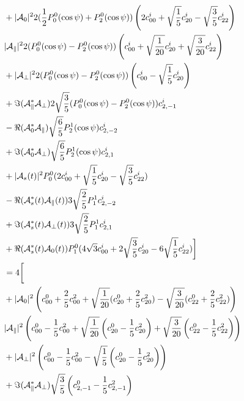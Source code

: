 \begin{align}
          &                  +|{\cal A}_0|^2 2 (\frac{1}{2}P_0^0(\cos\psi)+P_2^0(\cos\psi) ) \left( 2 c^i_{00}+\sqrt{\frac{1}{ 5}}c^i_{20}-\sqrt{\frac{3}{ 5}}c^i_{22} \right) \\
          &                   |{\cal A}_\parallel|^2 2( P_0^0(\cos\psi) - P_2^0(\cos\psi)  )           \left( c^i_{00}  +\sqrt{\frac{1}{20}}c^i_{20}+\sqrt{\frac{3}{20}}c^i_{22}  \right)  \\
          &                  +|{\cal A}_\perp|^2 2 ( P_0^0(\cos\psi) - P_2^0(\cos\psi)  )              \left( c^i_{00}  -\sqrt{\frac{1}{ 5}}c^i_{20}\right)\\
          &                  +\Im({\cal A}_\parallel^*{\cal A}_\perp)2\sqrt{\frac{3}{5}} ( P_0^0(\cos\psi) - P_2^0(\cos\psi)  ) c^i_{2,-1}  \\
          &                  -\Re({\cal A}_0^*{\cal A}_\parallel  )  \sqrt{\frac{6}{5}}P_2^1(\cos\psi) c^i_{2,-2}\\ 
          &                  +\Im({\cal A}_0^* {\cal A}_\perp )      \sqrt{\frac{6}{5}}P_2^1(\cos\psi)c^i_{2,1} \\
          &                  +|{\cal A}_{s}(t)|^2  P_0^0 (2c^i_{00} + \sqrt{\frac{1}{5}}c^i_{20} -\sqrt{\frac{3}{5}} c^i_{22}) \\
          &                  -\Re({\cal A}_{s}^*(t){\cal A}_\parallel(t)) 3\sqrt{\frac{2}{5}} P_1^1 c^i_{2,-2}\\
          &                  +\Im({\cal A}_{s}^*(t){\cal A}_\perp(t)) 3\sqrt{\frac{2}{5}} P_1^1 c^i_{2,1}\\
          &                  +\Re({\cal A}_{s}^*(t){\cal A}_0(t)) P_1^0( 4\sqrt{3}  c^i_{00} + 2 \sqrt{\frac{3}{5}} c^i_{20} - 6 \sqrt{\frac{1}{5}}c^i_{22})
      \biggr] \\
      &= 4\biggl[ \\
         &                   +|{\cal A}_0|^2   \left( c^0_{00}+\frac{2}{5}c^2_{00}+\sqrt{\frac{1}{20}}(c^0_{20}+\frac{2}{5}c^2_{20})-\sqrt{\frac{3}{20}}(c^0_{22}+\frac{2}{5}c^2_{22}) \right) \\
         &                    |{\cal A}_\parallel|^2 \left( c^0_{00}-\frac{1}{5}c^2_{00}+\sqrt{\frac{1}{20}}\left(c^0_{20}-\frac{1}{5}c^2_{20}\right)+\sqrt{\frac{3}{20}}\left(c^0_{22}-\frac{1}{5}c^2_{22}\right)  \right)  \\
         &                   +|{\cal A}_\perp|^2    \left( c^0_{00}-\frac{1}{5}c^2_{00} - \sqrt{\frac{1}{5}}\left(c^0_{20}-\frac{1}{5}c^2_{20}\right)\right)\\
         &                   +\Im({\cal A}_\parallel^*{\cal A}_\perp)\sqrt{\frac{3}{5}}\left(c^0_{2,-1}-\frac{1}{5}c^2_{2,-1}\right)  \\

\end{align}
